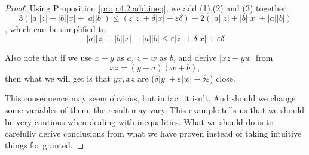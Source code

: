 \begin{proof}
Using Proposition \ref{prop.4.2.add.ineq}, we add (1),(2) and (3) together:
\[
3(|a||z| + |b||x| + |a||b|) \leq (\varepsilon|z| + \delta|x| + \varepsilon\delta) + 2(|a||z| + |b||x| + |a||b|)
\],
which can be simplified to
\[
|a||z| + |b||x| + |a||b| \leq \varepsilon|z| + \delta|x| + \varepsilon\delta
\]

Also note that if we use $x-y$ as $a$, $z-w$ as $b$, and derive $|xz-yw|$ from 
\[
xz=(y+a)(w+b),
\]
then what we will get is that $yx,xz$ are ($\delta|y| + \varepsilon|w| + \delta\varepsilon$) close.

This consequence may seem obvious, but in fact it isn't. And should we change some variables of them, the 
result may vary. This example tells us that we should be very cautious when dealing with inequalities. What we 
should do is to carefully derive conclusions from what we have proven instead of taking intuitive things for 
granted.
\end{proof}

